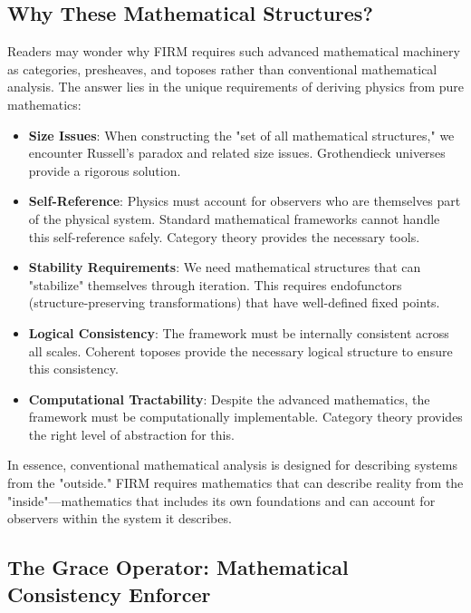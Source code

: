 \documentclass[12pt]{article}
\begin{document}
\subsection{Why These Mathematical Structures?}

Readers may wonder why FIRM requires such advanced mathematical machinery as categories, presheaves, and toposes rather than conventional mathematical analysis. The answer lies in the unique requirements of deriving physics from pure mathematics:

\begin{itemize}
    \item \textbf{Size Issues}: When constructing the "set of all mathematical structures," we encounter Russell's paradox and related size issues. Grothendieck universes provide a rigorous solution.
    
    \item \textbf{Self-Reference}: Physics must account for observers who are themselves part of the physical system. Standard mathematical frameworks cannot handle this self-reference safely. Category theory provides the necessary tools.
    
    \item \textbf{Stability Requirements}: We need mathematical structures that can "stabilize" themselves through iteration. This requires endofunctors (structure-preserving transformations) that have well-defined fixed points.
    
    \item \textbf{Logical Consistency}: The framework must be internally consistent across all scales. Coherent toposes provide the necessary logical structure to ensure this consistency.
    
    \item \textbf{Computational Tractability}: Despite the advanced mathematics, the framework must be computationally implementable. Category theory provides the right level of abstraction for this.
\end{itemize}

In essence, conventional mathematical analysis is designed for describing systems from the "outside." FIRM requires mathematics that can describe reality from the "inside"—mathematics that includes its own foundations and can account for observers within the system it describes.

\subsection{The Grace Operator: Mathematical Consistency Enforcer}
\end{document}
